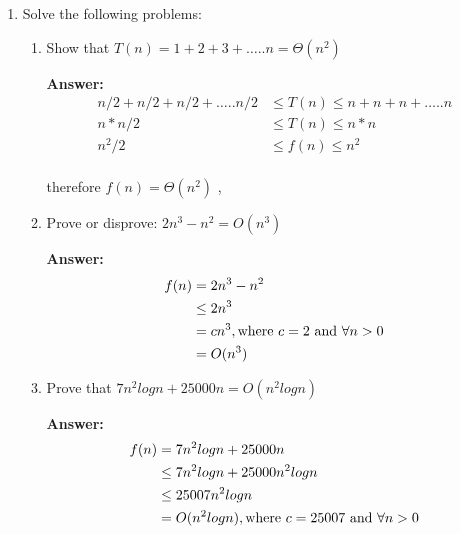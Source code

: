 \documentclass[a4paper]{article}
\begin{document}
\begin{enumerate}[label=(\alph*)]
     \vspace{0.5cm}
     \item Solve the following problems:
 
     \begin{enumerate}[label=(\roman*)]
         \item  Show that {$ T(n) = 1 + 2 + 3 + \ldots ..n = \Theta(n^2) $}
     
         \textbf{Answer:}
         \begin{align*}
             n/2 + n/2 + n/2 + \ldots ..n/2 &\le T(n) \le n + n + n + \ldots ..n \\
             n * n/2 &\le T(n) \le n * n \\
             n^2 / 2 &\le f(n) \le n^2 \\
         \end{align*}
         
         \begin{changemargin}{0.8cm}{0cm}
             therefore  {$f(n) = \Theta(n^2)$} , \quad {}
         \end{changemargin}
     
         \vspace{0.5cm}
         \item Prove or disprove: {$ 2n^3 - n^2 = O(n^3) $}
     
         \textbf{Answer:}
         \begin{align*}
             f(n) &= 2n^3 - n^2 \\
             &\le 2n^3 \\
             &= c n^3,  \text{where  $ c = 2 $  and  $ \forall   n > 0 $} \\
             &= O(n^3)
         \end{align*}
     
         \item Prove that {$ 7n^2 log n + 25000n = O(n^2log n) $}
     
         \textbf{Answer:}
         \begin{align*}
             f(n) &= 7n^2 log n + 25000n  \\
             &\le 7n^2 log n + 25000n^2 log n  \\
             &\le 25007n^2 log n \\
             &= O(n^2 log n), \text{where  $ c = 25007 $  and  $ \forall   n > 0 $} \\
         \end{align*}
         

\end{enumerate}
\end{enumerate}
\end{document}
